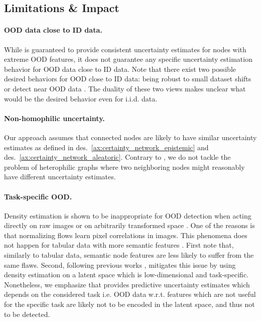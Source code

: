 \subsection{Limitations \& Impact} 
\label{sec:limitations_009}

\paragraph{OOD data close to ID data.} While \GPNacro{} is guaranteed to provide consistent uncertainty estimates for nodes with extreme OOD features, it does not guarantee any specific uncertainty estimation behavior for OOD data close to ID data. Note that there exist two possible desired behaviors for OOD close to ID data: being robust to small dataset shifts \citep{dataset-shift, stutz2020} or detect near OOD data \citep{contrastive-ood, robustness-uncertainty-dirichlet, attack-detection}. The duality of these two views makes unclear what would be the desired behavior even for i.i.d. data.

\paragraph{Non-homophilic uncertainty.} Our approach assumes that connected nodes are likely to have similar uncertainty estimates as defined in des.~\ref{ax:certainty_network_epistemic} and des.~\ref{ax:certainty_network_aleatoric}. Contrary to \cite{heterophily-gnn}, we do not tackle the problem of heterophilic graphs where two neighboring nodes might reasonably have different uncertainty estimates. 

\paragraph{Task-specific OOD.} Density estimation is shown to be inappropriate for OOD detection when acting directly on raw images \cite{typicality_OOD_generative, anomaly-detection, deep-generative} or on arbitrarily transformed space \cite{perfect-density-no-ood-guarantee}. One of the reasons is that normalizing flows learn pixel correlations in images. This phenomena  does not happen for tabular data with more semantic features \citep{why-nf-fail-ood}. First note that, similarly to tabular data, semantic node features are less likely to suffer from the same flaws. Second, following previous works \citep{charpentier2020, NatPN2021, why-nf-fail-ood, density-states-ood, contrastive-ood}, \GPNacro{} mitigates this issue by using density estimation on a latent space which is low-dimensional and task-specific. Nonetheless, we emphasize that \GPNacro{} provides predictive uncertainty estimates which depends on the considered task i.e. OOD data w.r.t. features which are not useful for the specific task are likely not to be encoded in the latent space, and thus not to be detected.

